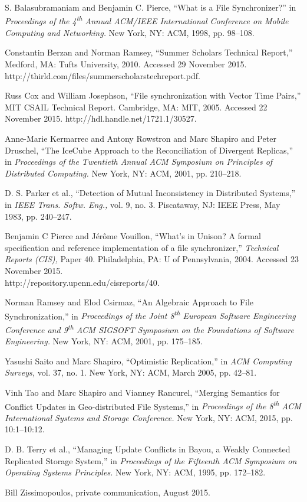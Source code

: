 
S. Balasubramaniam and Benjamin C. Pierce,
``What is a File Synchronizer?''
in \emph{Proceedings of the 4\textsuperscript{th} Annual 
ACM/IEEE International Conference on Mobile Computing and Networking.}
New York, NY: ACM, 1998, pp. 98--108.

Constantin Berzan and Norman Ramsey,
``Summer Scholars Technical Report,''
Medford, MA: Tufts University, 2010.
Accessed 29 November 2015.
http://thirld.com/files/summerscholars\undersc techreport.pdf.

Russ Cox and William Josephson,
``File synchronization with Vector Time Pairs,''
MIT CSAIL Technical Report.
Cambridge, MA: MIT,
2005.
Accessed 22 November 2015.
http://hdl.handle.net/1721.1/30527.

Anne-Marie Kermarrec and Antony Rowstron and Marc Shapiro and Peter Druschel,
``The IceCube Approach to the Reconciliation of Divergent Replicas,''
in \emph{Proceedings of the Twentieth Annual ACM Symposium on Principles of Distributed Computing.}
New York, NY: ACM, 2001, pp. 210--218.

D. S. Parker et al.,
``Detection of Mutual Inconsistency in Distributed Systems,''
in \emph{IEEE Trans. Softw. Eng.,}
vol. 9, no. 3.
Piscataway, NJ: IEEE Press,
May 1983,
pp. 240--247.

Benjamin C Pierce and J{\'e}r{\^o}me Vouillon,
``What's in Unison? A formal specification and reference implementation of a file synchronizer,''
\emph{Technical Reports (CIS),}
Paper 40.
Philadelphia, PA: U of Pennsylvania,
2004.
Accessed 23 November 2015.\\
http://repository.upenn.edu/cis\undersc reports/40.

Norman Ramsey and Elod Csirmaz,
``An Algebraic Approach to File Synchronization,''
in \emph{Proceedings of the Joint 8\textsuperscript{th} European Software Engineering Conference 
and 9\textsuperscript{th} ACM SIGSOFT Symposium on the Foundations of Software Engineering.}
New York, NY: ACM, 2001, pp. 175--185.

Yasushi Saito and Marc Shapiro,
``Optimistic Replication,''
in \emph{ACM Computing Surveys,}
vol. 37, no. 1.
New York, NY: ACM, March 2005,
pp. 42--81.

Vinh Tao and Marc Shapiro and Vianney Rancurel,
``Merging Semantics for Conflict Updates in Geo-distributed File Systems,''
in \emph{Proceedings of the 8\textsuperscript{th}
 ACM International Systems and Storage Conference.}
New York, NY: ACM, 2015, pp. 10:1--10:12.

D. B. Terry et al.,
``Managing Update Conflicts in Bayou, a Weakly Connected Replicated Storage System,''
in \emph{Proceedings of the Fifteenth ACM Symposium on Operating Systems Principles.}
New York, NY: ACM, 1995, pp. 172--182.

Bill Zissimopoulos, private communication, August 2015.
